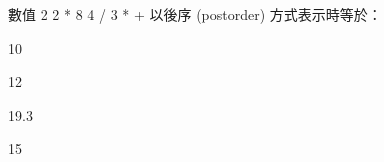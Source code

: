 \ifx\ntpcNinetyTwo\undefined[92學年基北區] \fi
數值 2 2 * 8 4 / 3 * + 以後序 (postorder) 方式表示時等於：
  \begin{optionlist}
  \item 10\label{ntpc-92-a25}
  \item 12
  \item 19.3
  \item 15
  \end{optionlist}